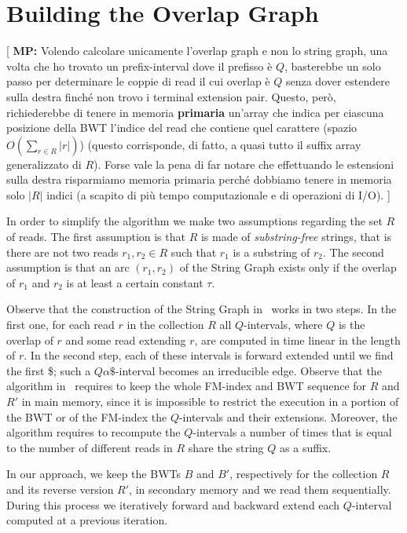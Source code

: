 \documentclass[runningheads,envcountsame,a4paper]{llncs}
\newcommand{\notaestesa}[2]{%
 \marginpar{\color{red!75!black}\textbf{\texttimes}}%
 {\color{red!75!black}%
 [\,\textbullet\,\textsf{\textbf{#1:}} %
 \textsf{\footnotesize#2}\,\textbullet\,]}%
}
\newcommand{\MP}[1]{\notaestesa{MP}{#1}}
\begin{document}
\section{Building the Overlap Graph}

\MP{Volendo calcolare unicamente l'overlap graph e non lo string graph,
una volta che ho trovato un prefix-interval dove il prefisso è $Q$,
basterebbe un solo passo per determinare le coppie di read il cui
overlap è $Q$ senza dover estendere sulla destra finché non trovo i
terminal extension pair. Questo, però, richiederebbe di tenere in
memoria \textbf{primaria} un'array che indica per ciascuna posizione
della BWT l'indice del read che contiene quel carattere (spazio
$O(\sum_{r \in R} |r|)$) (questo corrisponde, di fatto, a quasi tutto il
suffix array generalizzato di $R$). Forse vale la pena di far notare che
effettuando le estensioni sulla destra risparmiamo memoria primaria
perché dobbiamo tenere in memoria solo $|R|$ indici (a scapito di più
tempo computazionale e di operazioni di I/O).}






In order to simplify the algorithm we make two assumptions regarding the set $R$
of reads.
The first assumption is that $R$ is made of \emph{substring-free} strings, that is there are not two reads $r_{1}, r_{2}\in R$ such that
$r_{1}$  is a substring of  $r_{2}$.
The second assumption is that an arc $(r_{1}, r_{2})$ of the String Graph exists only if the overlap of $r_{1}$ and $r_{2}$ is at least a certain constant $\tau$.



Observe that the construction of the String Graph in~\cite{Simpson2010} works in two
steps.
In the first one, for each read $r$ in the collection $R$ all
$Q$-intervals, where $Q$ is the overlap of $r$ and some read extending $r$,
are computed in time linear in
the  length of $r$.
In the second step, each of these intervals is forward extended until
we find the first \$; such a $Q\alpha\$$-interval becomes an
irreducible edge.
Observe that the algorithm  in~\cite{Simpson2010} requires to keep the whole FM-index
and BWT sequence for $R$ and $R'$ in main memory, since it is impossible to
restrict the execution in a portion of the BWT or of the FM-index the $Q$-intervals
and their extensions.
Moreover, the algorithm requires to recompute the $Q$-intervals a number of
times that is equal to the number of different reads in $R$ share the
string $Q$ as a suffix.


In our approach, we keep the BWTs $B$  and  $B'$, respectively  for the collection $R$ and its
reverse version $R'$,  in secondary memory and we read them sequentially.
During this process we iteratively forward and backward extend each
$Q$-interval computed at a previous iteration.
\end{document}
